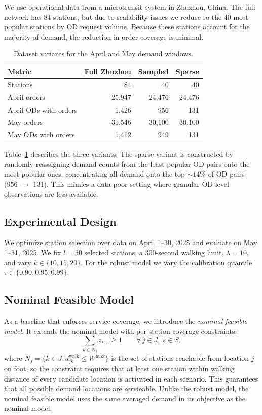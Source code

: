\documentclass[11pt]{article}
\theoremstyle{definition}
\begin{document}
We use operational data from a microtransit system in Zhuzhou, China.
The full network has 84 stations, but due to scalability issues we reduce to the 40 most
popular stations by OD request volume. Because these stations account for the
majority of demand, the reduction in order coverage is minimal.
\begin{table}[h]
	\centering
	\caption{Dataset variants for the April and May demand windows.}
	\label{tab:data-summary}
	\begin{tabular}{lrrr}
		\toprule
		Metric                & Full Zhuzhou & Sampled & Sparse \\
		\midrule
		Stations              & 84           & 40      & 40     \\
		April orders          & 25,947       & 24,476  & 24,476 \\
		April ODs with orders & 1,426        & 956     & 131    \\
		May orders            & 31,546       & 30,100  & 30,100 \\
		May ODs with orders   & 1,412        & 949     & 131    \\
		\bottomrule
	\end{tabular}
\end{table}

Table~\ref{tab:data-summary} describes the three variants. The sparse variant is constructed by randomly reassigning demand counts from the least popular OD pairs onto the most popular ones, concentrating all demand onto the top ${\sim}14\%$ of OD pairs (956 $\to$ 131). This mimics a data-poor setting where granular OD-level observations are less available.

\subsection{Experimental Design}

We optimize station selection over data on April 1--30, 2025 and evaluate on May 1--31, 2025. We fix $l=30$ selected stations, a 300-second walking limit,
$\lambda=10$, and vary $k \in \{10,15,20\}$. For the robust model we vary the
calibration quantile $\tau \in \{0.90,0.95,0.99\}$.

\subsection{Nominal Feasible Model}

As a baseline that enforces service coverage, we introduce
the \emph{nominal feasible model}. It extends the nominal model with per-station
coverage constraints:
\[
	\sum_{k \in N_j} z_{k,s} \geq 1 \qquad \forall\, j \in J,\ s \in S,
\]
where $N_j = \{k \in J : d_{jk}^{\mathrm{walk}} \leq W^{\max}\}$ is the set of stations reachable from location $j$ on foot, so the constraint requires that at least one station within walking distance of every candidate location is activated in each scenario. This guarantees that all possible demand locations are servieable. Unlike the robust model, the nominal feasible model uses the same averaged demand in its objective as the nominal model.
\end{document}

